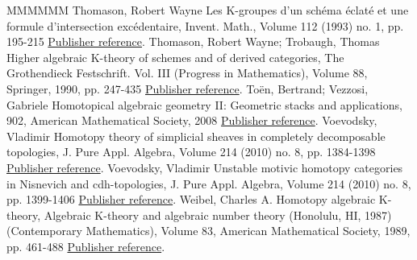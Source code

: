 \documentclass[11pt]{article}
\theoremstyle{definition}
\numberwithin{equation}{section}
\numberwithin{figure}{section}
\numberwithin{table}{section}
\begin{document}
\begin{thebibliography}{MMMMMM}
 Thomason, Robert Wayne Les K-groupes d’un schéma éclaté et une formule d’intersection excédentaire, Invent. Math., Volume 112 (1993) no. 1, pp. 195-215 \href{https://ahl.centre-mersenne.org/item/AHL_2020__3__1091_0/#ThomasonBlowup}{Publisher reference}.
 Thomason, Robert Wayne; Trobaugh, Thomas Higher algebraic K-theory of schemes and of derived categories, The Grothendieck Festschrift. Vol. III (Progress in Mathematics), Volume 88, Springer, 1990, pp. 247-435 \href{https://ahl.centre-mersenne.org/item/AHL_2020__3__1091_0/#ThomasonTrobaugh}{Publisher reference}.
 Toën, Bertrand; Vezzosi, Gabriele Homotopical algebraic geometry II: Geometric stacks and applications, 902, American Mathematical Society, 2008 \href{https://ahl.centre-mersenne.org/item/AHL_2020__3__1091_0/#HAG2}{Publisher reference}.
 Voevodsky, Vladimir Homotopy theory of simplicial sheaves in completely decomposable topologies, J. Pure Appl. Algebra, Volume 214 (2010) no. 8, pp. 1384-1398 \href{https://ahl.centre-mersenne.org/item/AHL_2020__3__1091_0/#VoevodskyCD}{Publisher reference}.
 Voevodsky, Vladimir Unstable motivic homotopy categories in Nisnevich and cdh-topologies, J. Pure Appl. Algebra, Volume 214 (2010) no. 8, pp. 1399-1406 \href{https://ahl.centre-mersenne.org/item/AHL_2020__3__1091_0/#VoevodskyCdh}{Publisher reference}.
 Weibel, Charles A. Homotopy algebraic K-theory, Algebraic K-theory and algebraic number theory (Honolulu, HI, 1987) (Contemporary Mathematics), Volume 83, American Mathematical Society, 1989, pp. 461-488 \href{https://ahl.centre-mersenne.org/item/AHL_2020__3__1091_0/#WeibelKH}{Publisher reference}.
\end{thebibliography}
\end{document}
